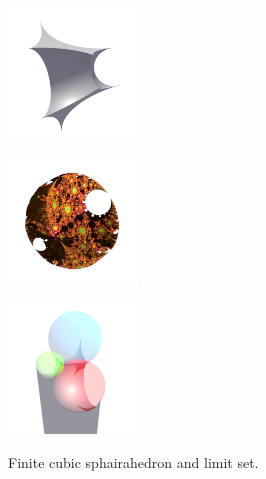 \documentclass[suppldata, dvipdfmx]{interact}
\theoremstyle{plain}%
\theoremstyle{definition}
\theoremstyle{remark}
\theoremstyle{problemstyle}
\begin{document}
\begin{figure}[h!tbp]
 \begin{minipage}{0.5\textwidth}
  \begin{minipage}[t]{0.24\textwidth}
   \centering
   \includegraphics[width=1.35in, height=1.35in,
   keepaspectratio]{./img/sphairahedron/cube/sphairahedronFinite.jpg}
   \label{fig:cubeFiniteSphairahedron}
  \end{minipage}
  \hspace*{\fill}
  \begin{minipage}[t]{0.24\textwidth}
   \centering
   \includegraphics[width=1.35in, height=1.35in,
   keepaspectratio]{./img/sphairahedron/cube/limitsetFinite.jpg}
   \label{fig:cubeFiniteLimitset}
  \end{minipage}
  \hspace*{\fill}
  \caption{Finite cubic sphairahedron and limit set.}
  \label{fig:cubeFinite}
 \end{minipage}
 \hspace*{\fill}
 \begin{minipage}{0.5\textwidth}
  \begin{minipage}[t]{0.24\textwidth}
   \centering
   \includegraphics[width=1.35in, height=1.35in,
   keepaspectratio]{./img/sphairahedron/cube/sphairahedronInf.jpg}
   \label{fig:cubeInfiniteSphairahedron}
  \end{minipage}

\end{minipage}
\end{figure}
\end{document}

